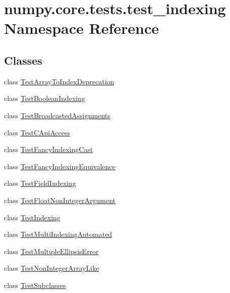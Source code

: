 \hypertarget{namespacenumpy_1_1core_1_1tests_1_1test__indexing}{}\section{numpy.\+core.\+tests.\+test\+\_\+indexing Namespace Reference}
\label{namespacenumpy_1_1core_1_1tests_1_1test__indexing}
\subsection*{Classes}
\begin{DoxyCompactItemize}
\item 
class \hyperlink{classnumpy_1_1core_1_1tests_1_1test__indexing_1_1TestArrayToIndexDeprecation}{Test\+Array\+To\+Index\+Deprecation}
\item 
class \hyperlink{classnumpy_1_1core_1_1tests_1_1test__indexing_1_1TestBooleanIndexing}{Test\+Boolean\+Indexing}
\item 
class \hyperlink{classnumpy_1_1core_1_1tests_1_1test__indexing_1_1TestBroadcastedAssignments}{Test\+Broadcasted\+Assignments}
\item 
class \hyperlink{classnumpy_1_1core_1_1tests_1_1test__indexing_1_1TestCApiAccess}{Test\+C\+Api\+Access}
\item 
class \hyperlink{classnumpy_1_1core_1_1tests_1_1test__indexing_1_1TestFancyIndexingCast}{Test\+Fancy\+Indexing\+Cast}
\item 
class \hyperlink{classnumpy_1_1core_1_1tests_1_1test__indexing_1_1TestFancyIndexingEquivalence}{Test\+Fancy\+Indexing\+Equivalence}
\item 
class \hyperlink{classnumpy_1_1core_1_1tests_1_1test__indexing_1_1TestFieldIndexing}{Test\+Field\+Indexing}
\item 
class \hyperlink{classnumpy_1_1core_1_1tests_1_1test__indexing_1_1TestFloatNonIntegerArgument}{Test\+Float\+Non\+Integer\+Argument}
\item 
class \hyperlink{classnumpy_1_1core_1_1tests_1_1test__indexing_1_1TestIndexing}{Test\+Indexing}
\item 
class \hyperlink{classnumpy_1_1core_1_1tests_1_1test__indexing_1_1TestMultiIndexingAutomated}{Test\+Multi\+Indexing\+Automated}
\item 
class \hyperlink{classnumpy_1_1core_1_1tests_1_1test__indexing_1_1TestMultipleEllipsisError}{Test\+Multiple\+Ellipsis\+Error}
\item 
class \hyperlink{classnumpy_1_1core_1_1tests_1_1test__indexing_1_1TestNonIntegerArrayLike}{Test\+Non\+Integer\+Array\+Like}
\item 
class \hyperlink{classnumpy_1_1core_1_1tests_1_1test__indexing_1_1TestSubclasses}{Test\+Subclasses}
\end{DoxyCompactItemize}
